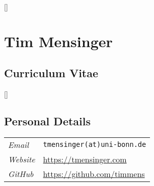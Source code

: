 \documentclass[11pt]{article}
\begin{document}
\thispagestyle{empty}
\renewcommand\labelitemi{\tiny$\bullet$}

\titlespacing*{\section}{0pt}{0pt}{0pt}
\titlespacing*{\subsection}{0pt}{0pt}{0pt}

\titleformat{\section}{\normalfont\Large\bfseries}{\thesection}{1em}{}[{\titlerule[0.8pt]}]


\section*{\hfill \LARGE Tim Mensinger}\vspace*{3pt}
\subsection*{\hfill Curriculum Vitae}

\titleformat{\subsection}{\normalfont\bfseries}{\thesection}{1em}{}[{\titlerule[0.4pt]}]

\vspace{15pt}
\subsection*{Personal Details}

\begin{table}[h!]
    \renewcommand{\arraystretch}{1.4}
    \begin{tabular}{p{90pt} p{380pt}}
         \textit{Email} & \texttt{tmensinger(at)uni-bonn.de}\\
         \textit{Website} & \url{https://tmensinger.com}\\
         \textit{GitHub} & \url{https://github.com/timmens}
    \end{tabular}
\end{table}
\end{document}

